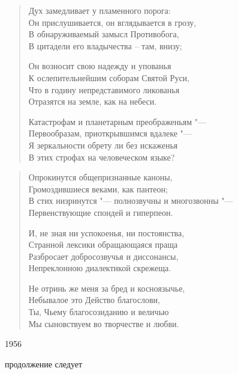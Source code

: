 \documentclass{beamer}
\begin{document}


\begin{frame}
\begin{verse}
Дух замедливает у пламенного порога:\\
Он прислушивается, он вглядывается в грозу,\\
В обнаруживаемый замысл  Противобога,\\
В цитадели его владычества – там, внизу;

Он возносит свою надежду и упованья\\
К ослепительнейшим соборам Святой Руси,\\
Что в годину непредставимого ликованья\\
Отразятся на земле, как на небеси.

Катастрофам и планетарным преображеньям "---\\
Первообразам, приоткрывшимся вдалеке "---\\
Я зеркальности обрету ли без искаженья\\
В этих строфах на человеческом языке?
\end{verse}
\end{frame}

\begin{frame}

\begin{verse}
Опрокинутся общепризнанные каноны,\\
Громоздившиеся веками, как пантеон;\\
В стих низринутся "--- полнозвучны и многозвонны "---\\
Первенствующие спондей и гиперпеон.

И, не зная ни успокоенья, ни постоянства,\\
Странной лексики обращающаяся праща\\
Разбросает добросозвучья и диссонансы,\\
Непреклонною диалектикой скрежеща.

Не отринь же меня за бред и косноязычье,\\
Небывалое это Действо благослови,\\
Ты, Чьему  благосозиданию и величью\\
Мы сыновствуем во творчестве и любви.

\end{verse}
1956
\end{frame}



\begin{frame}
\Huge{\centerline{продолжение следует}}
\end{frame}
\end{document}
